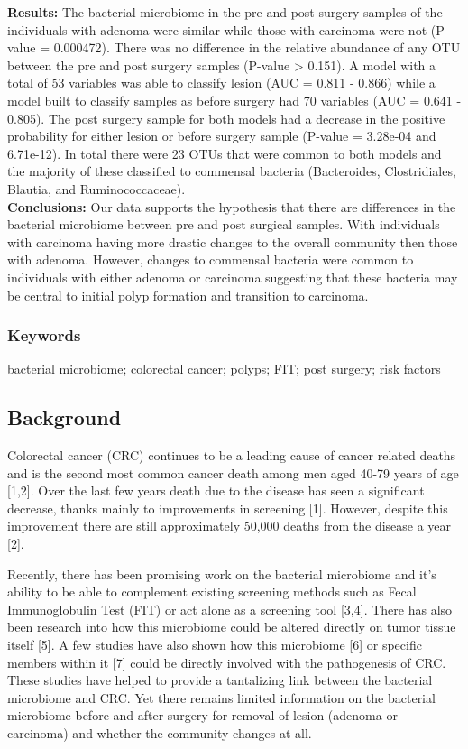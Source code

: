 \documentclass[12pt,]{article}
\begin{document}
\textbf{Results:} The bacterial microbiome in the pre and post surgery
samples of the individuals with adenoma were similar while those with
carcinoma were not (P-value = 0.000472). There was no difference in the
relative abundance of any OTU between the pre and post surgery samples
(P-value \textgreater{} 0.151). A model with a total of 53 variables was
able to classify lesion (AUC = 0.811 - 0.866) while a model built to
classify samples as before surgery had 70 variables (AUC = 0.641 -
0.805). The post surgery sample for both models had a decrease in the
positive probability for either lesion or before surgery sample (P-value
= 3.28e-04 and 6.71e-12). In total there were 23 OTUs that were common
to both models and the majority of these classified to commensal
bacteria (Bacteroides, Clostridiales, Blautia, and Ruminococcaceae).\\
\textbf{Conclusions:} Our data supports the hypothesis that there are
differences in the bacterial microbiome between pre and post surgical
samples. With individuals with carcinoma having more drastic changes to
the overall community then those with adenoma. However, changes to
commensal bacteria were common to individuals with either adenoma or
carcinoma suggesting that these bacteria may be central to initial polyp
formation and transition to carcinoma.

\newpage

\subsubsection{Keywords}\label{keywords}

bacterial microbiome; colorectal cancer; polyps; FIT; post surgery; risk
factors

\newpage

\subsection{Background}\label{background}

Colorectal cancer (CRC) continues to be a leading cause of cancer
related deaths and is the second most common cancer death among men aged
40-79 years of age {[}1,2{]}. Over the last few years death due to the
disease has seen a significant decrease, thanks mainly to improvements
in screening {[}1{]}. However, despite this improvement there are still
approximately 50,000 deaths from the disease a year {[}2{]}.

Recently, there has been promising work on the bacterial microbiome and
it's ability to be able to complement existing screening methods such as
Fecal Immunoglobulin Test (FIT) or act alone as a screening tool
{[}3,4{]}. There has also been research into how this microbiome could
be altered directly on tumor tissue itself {[}5{]}. A few studies have
also shown how this microbiome {[}6{]} or specific members within it
{[}7{]} could be directly involved with the pathogenesis of CRC. These
studies have helped to provide a tantalizing link between the bacterial
microbiome and CRC. Yet there remains limited information on the
bacterial microbiome before and after surgery for removal of lesion
(adenoma or carcinoma) and whether the community changes at all.
\end{document}
